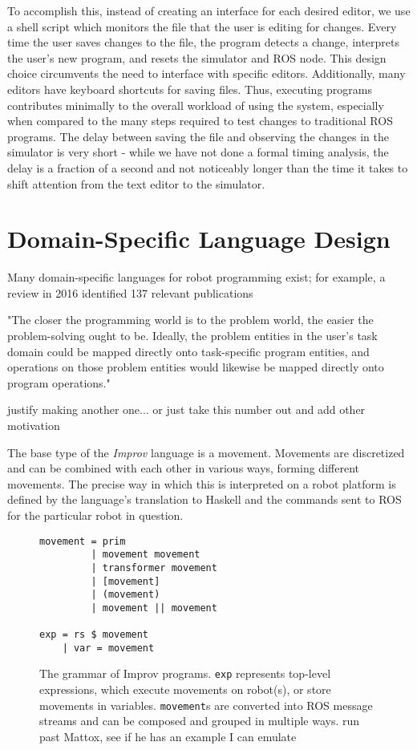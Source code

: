 \documentclass[sigconf]{acmart}
\begin{document}
To accomplish this, instead of creating an interface for each desired
editor, we use a shell script which monitors the file that the user is
editing for changes. Every time the user saves changes to the file, the
program detects a change, interprets the user's new program, and resets
the simulator and ROS node. This design choice circumvents the need to
interface with specific editors. Additionally, many editors have
keyboard shortcuts for saving files. Thus, executing programs
contributes minimally to the overall workload of using the system,
especially when compared to the many steps required to test changes to
traditional ROS programs. The delay between saving the file and observing the
changes in the simulator is very short - while we have not done a formal timing
analysis, the delay is a fraction of a second and not noticeably longer than the
time it takes to shift attention from the text editor to the simulator.


\section{Domain-Specific Language
Design}\label{domain-specific-language-design}

Many domain-specific languages for robot programming exist; for example, a
review in 2016 identified 137 relevant publications 

"The closer the programming world is to the problem world, the easier the
problem-solving ought to be. Ideally, the problem entities in the user's task
domain could be mapped directly onto task-specific program entities, and
operations on those problem entities would likewise be mapped directly onto
program operations."


{\color{red} justify making another one... or just take this number out and add
other motivation}

The base type of the \emph{Improv} language is a movement. Movements are
discretized and can be combined with each other in various ways, forming
different movements. The precise way in which this is interpreted on a
robot platform is defined by the language's translation to Haskell and
the commands sent to ROS for the particular robot in question.

\begin{figure}
\centering
\begin{verbatim}
movement = prim
         | movement movement
         | transformer movement
         | [movement]
         | (movement)
         | movement || movement 

exp = rs $ movement
    | var = movement
\end{verbatim}
\caption{The grammar of Improv programs. \texttt{exp} represents top-level
expressions, which execute movements on robot(s), or store movements in
variables. \texttt{movement}s are converted into ROS message streams and can be
composed and grouped in multiple ways. {\color{red} run past Mattox, see if he
has an example I can emulate}}

\end{figure}
\end{document}
